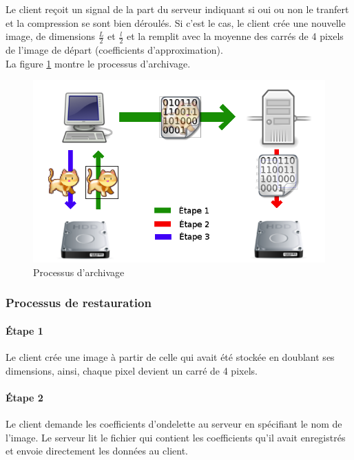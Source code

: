 \documentclass{article}
\begin{document}
Le client reçoit un signal de la part du serveur indiquant si oui ou non le tranfert et la compression se sont bien déroulés. Si c'est le cas, le client crée une nouvelle image, de dimensions $\frac{L}{2}$ et $\frac{l}{2}$ et la remplit avec la moyenne des carrés de 4 pixels de l'image de départ (coefficients d'approximation). \\


La figure \ref{save} montre le processus d'archivage.

\begin{figure}[!h]
\centering
\includegraphics[scale=0.5]{save.png}
\caption{Processus d'archivage}
\label{save}
\end{figure}


\subsubsection{Processus de restauration}

\paragraph{Étape 1}

Le client crée une image à partir de celle qui avait été stockée en doublant ses dimensions, ainsi, chaque pixel devient un carré de 4 pixels.

\paragraph{Étape 2}

Le client demande les coefficients d'ondelette au serveur en spécifiant le nom de l'image. Le serveur lit le fichier qui contient les coefficients qu'il avait enregistrés et envoie directement les données au client.
\end{document}

